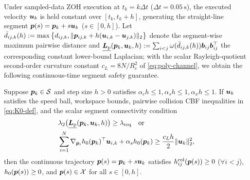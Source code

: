 Under sampled-data ZOH execution at $t_k=k\Delta t$ ($\Delta t=0.05\ \mathrm s$), the executed velocity $\boldsymbol{u}_k$ is held constant over $[t_k,t_k+h]$, generating the straight-line segment $\boldsymbol{p}(s)=\boldsymbol{p}_k+s\boldsymbol{u}_k$ ($s\in[0,h]$). Let $\bar d_{ij,k}(h):=\max\big\{d_{ij,k},\lVert\boldsymbol{p}_{ij,k}+h(\boldsymbol{u}_{i,k}-\boldsymbol{u}_{j,k})\rVert_2\big\}$ denote the segment-wise maximum pairwise distance and $\underline{\boldsymbol{L}_{\mathrm{p}}}(\boldsymbol{p}_k,\boldsymbol{u}_k,h):=\sum_{i<j}\omega(\bar d_{ij,k}(h))\boldsymbol b_{ij}\boldsymbol b_{ij}^{\top}$ the corresponding constant lower-bound Laplacian; with the scalar Rayleigh-quotient second-order curvature constant $c_L=8N/R_c^2$ of \eqref{eq:poly-channel}, we obtain the following continuous-time segment safety guarantee.

\begin{theorem}\label{thm:zoh-safe}
Suppose $\boldsymbol{p}_k\in\mathcal S$ and step size $h>0$ satisfies $\alpha_c h\le 1,\alpha_s h\le 1,\alpha_x h\le 1$. If $\boldsymbol{u}_k$ satisfies the speed ball, workspace bounds, pairwise collision CBF inequalities in \eqref{eq:K0-def}, and the scalar segment connectivity condition
\begin{equation}
\begin{split}
 &\lambda_2\big(\underline{\boldsymbol{L}_{\mathrm{p}}}(\boldsymbol{p}_k,\boldsymbol{u}_k,h)\big)\ge\lambda_{\mathrm{req}}\quad\text{or}\\
 &\sum_{i=1}^N\nabla_{\boldsymbol{p}_i}h_0(\boldsymbol{p}_k)^{\top}\boldsymbol{u}_{i,k}+\alpha_s h_0(\boldsymbol{p}_k)\ge\frac{c_L h}{2}\lVert\boldsymbol{u}_k\rVert_2^2,
\end{split}
 \label{eq:zoh-tightened}
\end{equation}
then the continuous trajectory $\boldsymbol{p}(s)=\boldsymbol{p}_k+s\boldsymbol{u}_k$ satisfies $h_{ij}^{\mathrm{col}}(\boldsymbol{p}(s))\ge 0$ ($\forall i<j$), $h_0(\boldsymbol{p}(s))\ge 0$, and $\boldsymbol{p}(s)\in\mathcal X$ for all $s\in[0,h]$.
\end{theorem}
